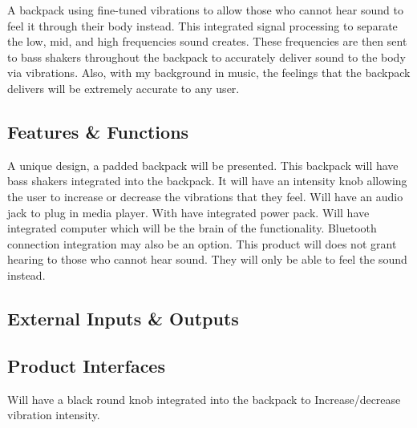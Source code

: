 A backpack using fine-tuned vibrations to allow those who cannot hear sound to feel it through their body instead. This integrated signal processing to separate the low, mid, and high frequencies sound creates. These frequencies are then sent to bass shakers throughout the backpack to accurately deliver sound to the body via vibrations. Also, with my background in music, the feelings that the backpack delivers will be extremely accurate to any user. 

\subsection{Features \& Functions}
A unique design, a padded backpack will be presented. This backpack will have bass shakers integrated into the backpack. It will have an intensity knob allowing the user to increase or decrease the vibrations that they feel. Will have an audio jack to plug in media player. With have integrated power pack. Will have integrated computer which will be the brain of the functionality. Bluetooth connection integration may also be an option. This product will does not grant hearing to those who cannot hear sound. They will only be able to feel the sound instead.

\subsection{External Inputs \& Outputs}
\begin{table}[h]
\end{table}

\subsection{Product Interfaces}
Will have a black round knob integrated into the backpack to Increase/decrease vibration intensity. 
